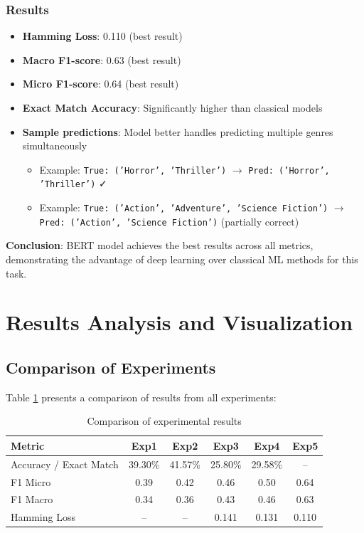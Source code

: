 \documentclass[12pt,a4paper]{article}
\begin{document}
\subsubsection{Results}
\begin{itemize}
    \item \textbf{Hamming Loss}: 0.110 (best result)
    \item \textbf{Macro F1-score}: 0.63 (best result)
    \item \textbf{Micro F1-score}: 0.64 (best result)
    \item \textbf{Exact Match Accuracy}: Significantly higher than classical models
    \item \textbf{Sample predictions}: Model better handles predicting multiple genres simultaneously
    \begin{itemize}
        \item Example: \texttt{True: ('Horror', 'Thriller')} $\rightarrow$ \texttt{Pred: ('Horror', 'Thriller')} ✓
        \item Example: \texttt{True: ('Action', 'Adventure', 'Science Fiction')} $\rightarrow$ \texttt{Pred: ('Action', 'Science Fiction')} (partially correct)
    \end{itemize}
\end{itemize}

\textbf{Conclusion}: BERT model achieves the best results across all metrics, demonstrating the advantage of deep learning over classical ML methods for this task.

\section{Results Analysis and Visualization}

\subsection{Comparison of Experiments}

Table \ref{tab:results} presents a comparison of results from all experiments:

\begin{table}[h]
\centering
\begin{tabular}{lccccc}
\toprule
\textbf{Metric} & \textbf{Exp1} & \textbf{Exp2} & \textbf{Exp3} & \textbf{Exp4} & \textbf{Exp5} \\
\midrule
Accuracy / Exact Match & 39.30\% & 41.57\% & 25.80\% & 29.58\% & -- \\
F1 Micro               & 0.39    & 0.42    & 0.46    & 0.50    & 0.64 \\
F1 Macro               & 0.34    & 0.36    & 0.43    & 0.46    & 0.63 \\
Hamming Loss           & --      & --      & 0.141   & 0.131   & 0.110 \\
\bottomrule
\end{tabular}
\caption{Comparison of experimental results}
\label{tab:results}
\end{table}
\end{document}
